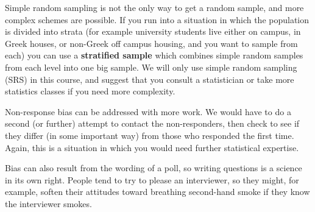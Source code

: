   Simple random sampling is not the only way to get a random
  sample, and more complex schemes are possible.  If you run into a
  situation in which the population is divided into strata (for
  example university students live either on campus, in Greek houses,
  or non-Greek off campus housing, and you want to sample from each)
  you can use a {\bf stratified sample} which combines simple random
  samples from each level into one big sample.  We will only use simple random
  sampling (SRS) in this course, and suggest that you consult a
  statistician or take more statistics classes if you need more
  complexity. 

 Non-response bias can be addressed with more work.  We would have to
 do a second (or further) attempt to contact the non-responders, then 
 check to see if they differ (in some important way) from those who
 responded the first time.  Again, this is a situation in which you
 would need further statistical expertise.

 Bias can also result from the wording of a poll, so writing questions
 is a science in its own right.  People tend to try
 to please an interviewer, so they might, for example, soften their
 attitudes toward breathing second-hand smoke if they know the interviewer
 smokes. 
\newpage

